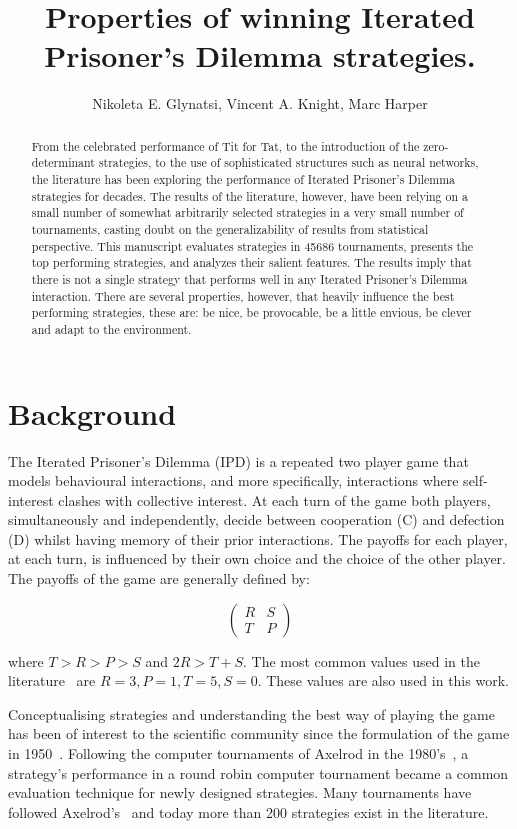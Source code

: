 \documentclass{article}
\title{Properties of winning Iterated Prisoner's Dilemma strategies.}
\author{Nikoleta E. Glynatsi, Vincent A. Knight, Marc Harper}
\date{}
\newcommand{\numberofstrategies}{}
\begin{document}
\maketitle

\begin{abstract}
From the celebrated performance of Tit for Tat, to the
introduction of the zero-determinant strategies, to the use of sophisticated
structures such as neural networks, the literature has been exploring the
performance of Iterated Prisoner's Dilemma strategies for decades. The results of the literature,
however, have been relying on a small number of somewhat arbitrarily selected
strategies in a very small number of tournaments,
casting doubt on the generalizability of results from statistical perspective.
This manuscript evaluates \numberofstrategies strategies in 45686
tournaments, presents the top performing strategies, and analyzes their
salient features. The results imply that there is not a single
strategy that performs well in any Iterated Prisoner's Dilemma interaction.
There are several properties, however, that heavily influence the best performing
strategies, these are: be nice, be provocable, be a little envious, be clever
and adapt to the environment.
\end{abstract}

\section{Background}

The Iterated Prisoner's Dilemma (IPD) is a repeated two player game that models
behavioural interactions, and more specifically, interactions where
self-interest clashes with collective interest. At each turn of the game both
players, simultaneously and independently, decide between cooperation (C) and
defection (D) whilst having memory of their prior interactions. The payoffs for each
player, at each turn, is influenced by their own choice and the choice of the
other player. The payoffs of the game are generally defined by:

\[\begin{pmatrix}
R & S \\
T & P
\end{pmatrix}\]

where \(T > R > P > S\) and \(2R > T + S\). The most common values used in
the literature~\cite{Axelrod1981} are $R=3, P=1, T=5, S=0$. These values are also
used in this work.

Conceptualising strategies and understanding the best way of playing the game
has been of interest to the scientific community since the formulation of the
game in 1950~\cite{Flood1958}. Following the computer tournaments of Axelrod in the
1980's~\cite{Axelrod1980a, Axelrod1980b}, a strategy's performance in a round
robin computer tournament became a common evaluation technique for newly designed
strategies. Many tournaments have followed Axelrod's~\cite{Bendor1991,
Harper2017, Kendall2007, Stephens2002, Stewart2012} and today more than 200
strategies exist in the literature.
\end{document}
